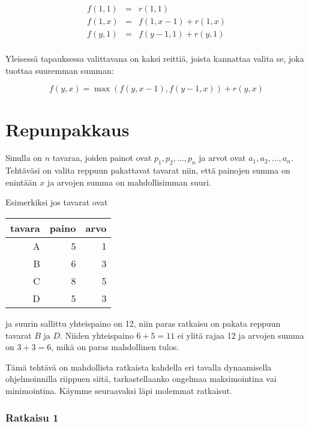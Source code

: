 \[
\begin{array}{lcl}
f(1,1) & = & r(1,1) \\
f(1,x) & = & f(1,x-1)+r(1,x) \\
f(y,1) & = & f(y-1,1)+r(y,1)\\
\end{array}
\]

Yleisessä tapauksessa valittavana on
kaksi reittiä,
joista kannattaa valita se,
joka tuottaa suuremman summan:

\[ f(y,x) = \max(f(y,x-1),f(y-1,x))+r(y,x)\]

\section{Repunpakkaus}


\begin{task}
Sinulla on $n$ tavaraa, joiden painot ovat
$p_1,p_2,\ldots,p_n$ ja arvot ovat
$a_1,a_2,\ldots,a_n$.
Tehtäväsi on valita reppuun pakattavat tavarat
niin, että painojen summa on enintään $x$
ja arvojen summa on mahdollisimman suuri.
\end{task}

\begin{samepage}
Esimerkiksi jos tavarat ovat

\begin{center}
\begin{tabular}{rrr}
tavara & paino & arvo \\
\hline
A & 5 & 1 \\
B & 6 & 3 \\
C & 8 & 5 \\
D & 5 & 3 \\
\end{tabular}
\end{center}
\end{samepage}

ja suurin sallittu yhteispaino on 12,
niin paras ratkaisu on pakata reppuun tavarat $B$ ja $D$.
Niiden yhteispaino $6+5=11$ ei ylitä rajaa 12
ja arvojen summa
on $3+3=6$, mikä on paras mahdollinen tulos.

Tämä tehtävä on mahdollista ratkaista kahdella eri
tavalla dynaamisella ohjelmoinnilla
riippuen siitä, tarkastellaanko ongelmaa
maksimointina vai minimointina.
Käymme seuraavaksi läpi molemmat ratkaisut.

\subsubsection{Ratkaisu 1}

